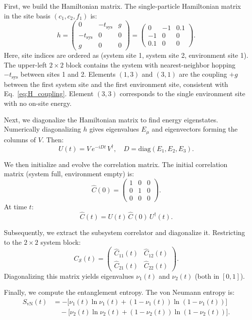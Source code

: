 \documentclass[12pt,oneside,openright]{report}
\theoremstyle{definition}
\theoremstyle{plain}
\theoremstyle{remark}
\newcommand{\beq}{\begin{equation}}
\newcommand{\eeq}{\end{equation}}
\begin{document}
First, we build the Hamiltonian matrix. The single-particle Hamiltonian matrix in the site basis $(c_1, c_2, f_1)$ is:
\beq
h = \begin{pmatrix}
0 & -t_{\mathrm{sys}} & g \\
-t_{\mathrm{sys}} & 0 & 0 \\
g & 0 & 0
\end{pmatrix}
= \begin{pmatrix}
0 & -1 & 0.1 \\
-1 & 0 & 0 \\
0.1 & 0 & 0
\end{pmatrix}.
\label{eq:example_h}
\eeq
Here, site indices are ordered as (system site 1, system site 2, environment site 1). 
The upper-left $2\times 2$ block contains the system with nearest-neighbor hopping $-t_{\mathrm{sys}}$ 
between sites 1 and 2. Elements $(1,3)$ and $(3,1)$ are the coupling $+g$ between the first system site 
and the first environment site, consistent with Eq.~\eqref{eq:H_coupling}. Element $(3,3)$ corresponds 
to the single environment site with no on-site energy.

Next, we diagonalize the Hamiltonian matrix to find energy eigenstates. Numerically diagonalizing $h$ gives eigenvalues $E_\mu$ and eigenvectors forming the columns of $V$. Then:
\beq
U(t) = V\, e^{-i D t}\, V^\dagger, \quad D = \mathrm{diag}(E_1, E_2, E_3).
\label{eq:example_U}
\eeq

We then initialize and evolve the correlation matrix. The initial correlation matrix (system full, environment empty) is:
\beq
\hat C(0) = \begin{pmatrix}
1 & 0 & 0 \\
0 & 1 & 0 \\
0 & 0 & 0
\end{pmatrix}.
\label{eq:example_C0}
\eeq
At time $t$:
\beq
\hat C(t) = U(t)\, \hat C(0)\, U^\dagger(t).
\label{eq:example_Ct}
\eeq

Subsequently, we extract the subsystem correlator and diagonalize it. Restricting to the $2\times 2$ system block:
\beq
C_{\mathcal{S}}(t) = \begin{pmatrix}
\hat C_{11}(t) & \hat C_{12}(t) \\
\hat C_{21}(t) & \hat C_{22}(t)
\end{pmatrix}.
\label{eq:example_Csys}
\eeq
Diagonalizing this matrix yields eigenvalues $\nu_1(t)$ and $\nu_2(t)$ (both in $[0,1]$).

Finally, we compute the entanglement entropy. The von Neumann entropy is:
\begin{align}
S_{\mathrm{vN}}(t) &= -\Big[\nu_1(t)\ln\nu_1(t) + (1-\nu_1(t))\ln(1-\nu_1(t))\Big] \nonumber\\
&\quad -\Big[\nu_2(t)\ln\nu_2(t) + (1-\nu_2(t))\ln(1-\nu_2(t))\Big].
\label{eq:example_entropy}
\end{align}
\end{document}
